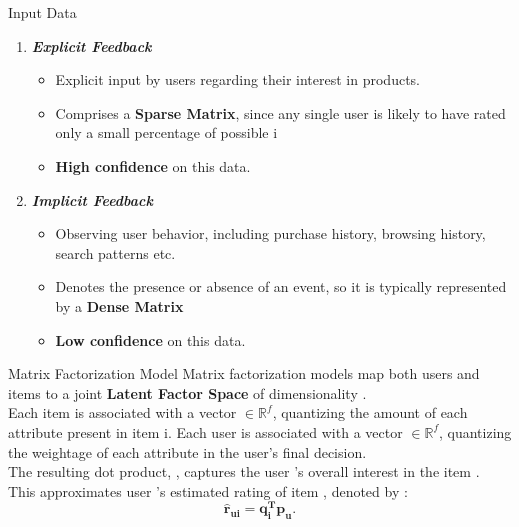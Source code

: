 \documentclass[10pt]{beamer}
\begin{document}
\begin{frame}[fragile]{Input Data}
 \begin{enumerate}
   \item \textbf{\textit{Explicit Feedback}}
   \vspace{3mm}
   \begin{itemize}
     \item Explicit input by users regarding their interest in products.
     \vspace{3mm}
     \item Comprises a \textbf{Sparse Matrix}, since any single user is likely to have rated only a small percentage of possible i
      \vspace{3mm}
     \item \textbf{High confidence} on this data.
   \end{itemize}
   \vspace{3mm}
   \item \textbf{\textit{Implicit Feedback}}
   \vspace{3mm}
   \begin{itemize}
       \item Observing user behavior, including purchase history, browsing history, search patterns etc.
       \vspace{3mm}
       \item Denotes the presence or absence of an event, so it is typically represented by a \textbf{Dense Matrix}
       \vspace{3mm}
     \item \textbf{Low confidence} on this data.
   \end{itemize}
\end{enumerate}
\end{frame}

\begin{frame}[fragile]{Matrix Factorization Model}
Matrix factorization models map both users and items to a joint \textbf{Latent Factor Space} of dimensionality .\\
\vspace{3mm}
Each item  is associated with a vector  $\in \mathbb{R}^{f} $, quantizing the amount of each attribute present in item {i}.
\newline Each user  is associated with a vector  $\in \mathbb{R}^{f}$, quantizing the weightage of each attribute in the user's final decision.\\
\vspace{3mm}
The resulting dot product, , captures the user ’s overall interest in the item .\\
\vspace{3mm}
This approximates user 's estimated rating of item , denoted by :
\begin{equation}
    \boldsymbol{\hat{r}_{ui}=q_{i}^{T}p_{u}}.
\end{equation}
\end{frame}
\end{document}
